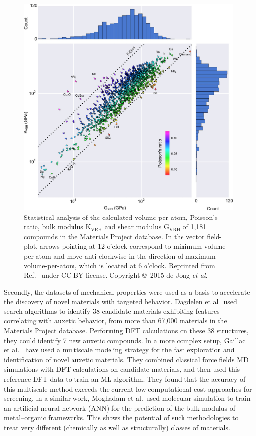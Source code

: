\documentclass[main.tex]{subfiles}
\begin{document}
\begin{figure}[ht]
\centering
  \includegraphics[width=0.8\linewidth]{figures/1-screening/deJong2015.jpeg}
  \caption{Statistical analysis of the calculated volume per atom, Poisson's ratio, bulk modulus {$\mathrm{K_{VRH}}$} and shear modulus {$\mathrm{G_{VRH}}$ of} 1,181 compounds in the Materials Project database. In the vector field-plot, arrows pointing at 12 o'clock correspond to minimum volume-per-atom and move anti-clockwise in the direction of maximum volume-per-atom, which is located at 6 o'clock. Reprinted from Ref.~\cite{deJong_2015} under CC-BY license. Copyright \copyright\  2015 de Jong \emph{et al}.}\label{fgr:deJong2015}
\end{figure}

Secondly, the datasets of mechanical properties were used as a basis to accelerate the discovery of novel materials with targeted behavior. Dagdelen et al.\ used search algorithms to identify 38 candidate materials exhibiting features correlating with auxetic behavior, from more than 67,000 materials in the Materials Project database.\autocite{Dagdelen_2017} Performing DFT calculations on these 38 structures, they could identify 7 new auxetic compounds. In a more complex setup, Gaillac et al.~\autocite{Gaillac_2020} have used a multiscale modeling strategy for the fast exploration and identification of novel auxetic materials. They combined classical force fields MD simulations with DFT calculations on candidate materials, and then used this reference DFT data to train an ML algorithm. They found that the accuracy of this multiscale method exceeds the current low-computational-cost approaches for screening. In a similar work, Moghadam et al.\ used molecular simulation to train an artificial neural network (ANN) for the prediction of the bulk modulus of metal--organic frameworks.\autocite{Moghadam_2019} This shows the potential of such methodologies to treat very different (chemically as well as structurally) classes of materials.
\end{document}
